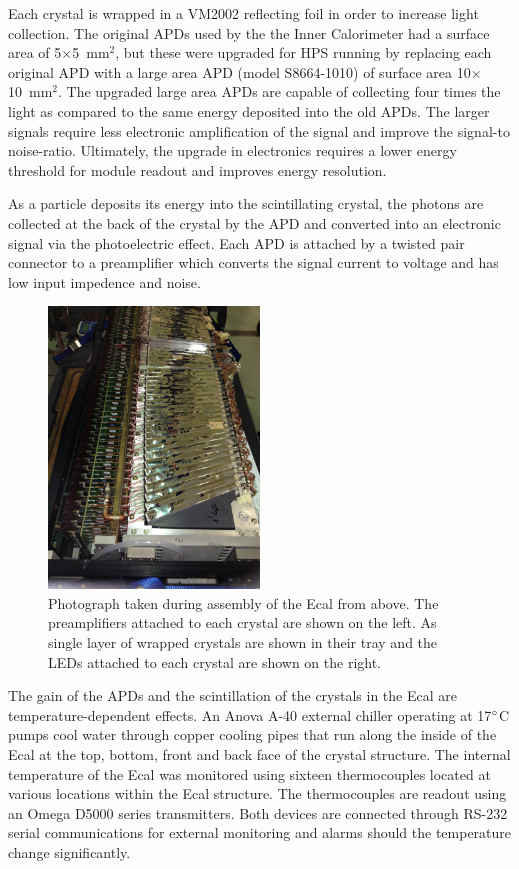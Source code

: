 \documentclass[12pt]{report}
\begin{document}
Each crystal is wrapped in a VM2002 reflecting foil in order to increase light collection. The original APDs used by the the Inner Calorimeter had a surface area of 5$\times$5~mm$^2$, but these were upgraded for HPS running by replacing each original APD with a large area APD (model S8664-1010) of surface area 10$\times$10~mm$^2$. The upgraded large area APDs are capable of collecting four times the light as compared to the same energy deposited into the old APDs. The larger signals require less electronic amplification of the signal and improve the signal-to noise-ratio. Ultimately, the upgrade in electronics requires a lower energy threshold for module readout and improves energy resolution. 

As a particle deposits its energy into the scintillating crystal, the photons are collected at the back of the crystal by the APD and converted into an electronic signal via the photoelectric effect. Each APD is attached by a twisted pair connector to a preamplifier which converts the signal current to voltage and has low input impedence and noise.  

\begin{figure}[H]
  \centering
      \includegraphics[width=0.5\textwidth]{pics/experiment/ecalAssembly1.png}
  \caption[Photograph of Ecal crystals during assembly]{Photograph taken during assembly of the Ecal from above. The preamplifiers attached to each crystal are shown on the left. As single layer of wrapped crystals are shown in their tray and the LEDs attached to each crystal are shown on the right.}
  \label{Figure:ecalAssembly1}
\end{figure}

The gain of the APDs and the scintillation of the crystals in the Ecal are temperature-dependent effects. An Anova A-40 external chiller operating at 17$\degree$C pumps cool water through copper cooling pipes that run along the inside of the Ecal at the top, bottom, front and back face of the crystal structure. The internal temperature of the Ecal was monitored using sixteen thermocouples located at various locations within the Ecal structure. The thermocouples are readout using an Omega D5000 series transmitters. Both devices are connected through RS-232 serial communications for external monitoring and alarms should the temperature change significantly.
\end{document}

